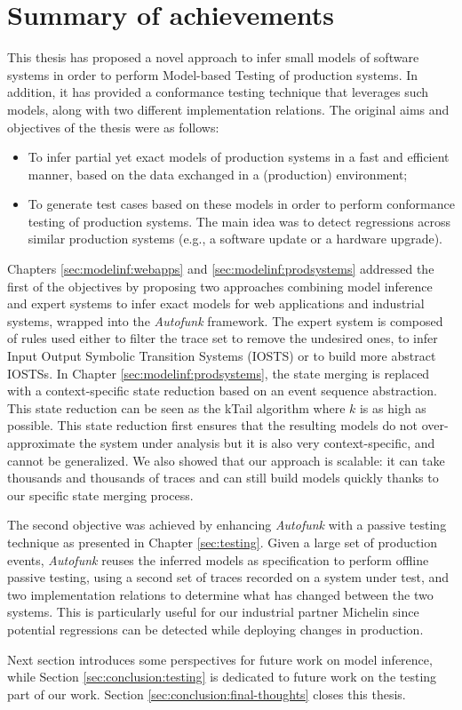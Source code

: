 \section{Summary of achievements}

This thesis has proposed a novel approach to infer small models
of software systems in order to perform Model-based Testing of
production systems. In addition, it has provided a conformance
testing technique that leverages such models, along with two
different implementation relations. The original aims and
objectives of the thesis were as follows:

\begin{itemize}
    \item To infer partial yet exact models of production systems
        in a fast and efficient manner, based on the data
        exchanged in a (production) environment;

    \item To generate test cases based on these models in order
        to perform conformance testing of production systems. The
        main idea was to detect regressions across similar
        production systems (e.g., a software update or a hardware
        upgrade).
\end{itemize}

Chapters \ref{sec:modelinf:webapps} and
\ref{sec:modelinf:prodsystems} addressed the first of the
objectives by proposing two approaches combining model inference
and expert systems to infer exact models for web applications and
industrial systems, wrapped into the \textit{Autofunk} framework.
The expert system is composed of rules used either to filter the
trace set to remove the undesired ones, to infer Input Output
Symbolic Transition Systems (IOSTS) or to build more abstract
IOSTSs. In Chapter \ref{sec:modelinf:prodsystems}, the state
merging is replaced with a context-specific state reduction based
on an event sequence abstraction. This state reduction can be
seen as the kTail algorithm \cite{5009015} where $k$ is as high
as possible.  This state reduction first ensures that the
resulting models do not over-approximate the system under
analysis but it is also very context-specific, and cannot be
generalized. We also showed that our approach is scalable: it can
take thousands and thousands of traces and can still build models
quickly thanks to our specific state merging process.

The second objective was achieved by enhancing \textit{Autofunk}
with a passive testing technique as presented in Chapter
\ref{sec:testing}. Given a large set of production events,
\textit{Autofunk} reuses the inferred models as specification to
perform offline passive testing, using a second set of traces
recorded on a system under test, and two implementation relations
to determine what has changed between the two systems. This is
particularly useful for our industrial partner Michelin since
potential regressions can be detected while deploying changes in
production.

Next section introduces some perspectives for future work on
model inference, while Section \ref{sec:conclusion:testing} is
dedicated to future work on the testing part of our work. Section
\ref{sec:conclusion:final-thoughts} closes this thesis.
